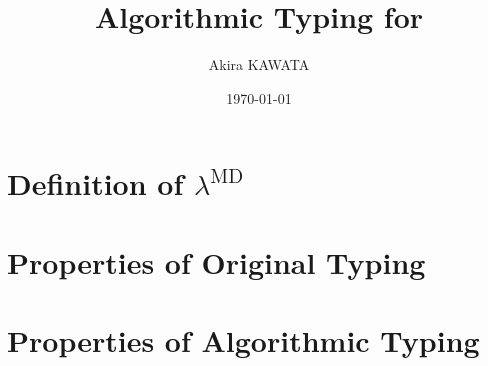 \documentclass[9pt, a4paper]{extarticle}
\title{Algorithmic Typing for \LMD}
\author{Akira KAWATA}
\date{\today}
\theoremstyle{break}
\begin{document}
\maketitle

\section{Definition of \(\lambda^\text{MD}\)}


\section{Properties of Original Typing}


\section{Properties of Algorithmic Typing}

\end{document}
